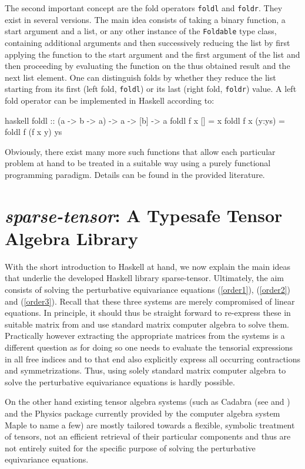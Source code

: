 The second important concept are the fold operators \texttt{foldl} and \texttt{foldr}. They exist in several versions. The main idea consists of taking a binary function, a start argument and a list, or any other instance of the \texttt{Foldable} type class, containing additional arguments and then successively reducing the list by first applying the function to the start argument and the first argument of the list and then proceeding by evaluating the function on the thus obtained result and the next list element. One can distinguish folds by whether they reduce the list starting from its first (left fold, \texttt{foldl}) or its last (right fold, \texttt{foldr}) value. A left fold operator can be implemented in Haskell according to:
\begin{center}
\begin{cminted}{haskell}
foldl :: (a -> b -> a) -> a -> [b] -> a 
foldl f x [] = x 
foldl f x (y:ys) = foldl f (f x y) ys
\end{cminted}
\end{center}
Obviously, there exist many more such functions that allow each particular problem at hand to be treated in a suitable way using a purely functional programming paradigm. Details can be found in the provided literature.

\section{\textit{sparse-tensor}: A Typesafe Tensor Algebra Library }
With the short introduction to Haskell at hand, we now explain the main ideas that underlie the developed Haskell library sparse-tensor. Ultimately, the aim consists of solving the perturbative equivariance equations (\ref{order1}), (\ref{order2}) and (\ref{order3}). Recall that these three systems are merely compromised of linear equations. In principle, it should thus be straight forward to re-express these in suitable matrix from and use standard matrix computer algebra to solve them. Practically however extracting the appropriate matrices from the systems is a different question as for doing so one needs to evaluate the tensorial expressions in all free indices and to that end also
explicitly express all occurring contractions and symmetrizations.
Thus, using solely standard matrix computer algebra to solve the perturbative equivariance equations is hardly possible.

On the other hand existing tensor algebra systems (such as Cadabra (see \cite{cadabra1} and \cite{cadabra2}) and the Physics package \cite{MaplePhysics} currently provided by the computer algebra system Maple to name a few) are mostly tailored towards a flexible, symbolic treatment of tensors, not an efficient retrieval of their particular components and thus are not entirely suited for the specific purpose of solving the perturbative equivariance equations. 

